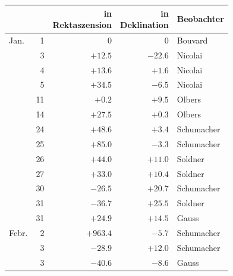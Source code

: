 \begin{center}
\begin{tabular}{lr|r|r|l}
 & & \shortstack{in\\Rektaszension} & \shortstack{in\\Deklination} & Beobachter \\
\hline
Jan. & 1 & 0 & 0 & Bouvard \\
 & 3 & $+12.5$ & $-22.6$ & Nicolai \\
 & 4 & $+13.6$ & $+1.6$ & Nicolai \\
 & 5 & $+34.5$ & $-6.5$ & Nicolai \\
 & 11 & $+0.2$ & $+9.5$ & Olbers \\
 & 14 & $+27.5$ & $+0.3$ & Olbers \\
 & 24 & $+48.6$ & $+3.4$ & Schumacher \\
 & 25 & $+85.0$ & $-3.3$ & Schumacher \\
 & 26 & $+44.0$ & $+11.0$ & Soldner \\
 & 27 & $+33.0$ & $+10.4$ & Soldner \\
 & 30 & $-26.5$ & $+20.7$ & Schumacher \\
 & 31 & $-36.7$ & $+25.5$ & Soldner \\
 & 31 & $+24.9$ & $+14.5$ & Gauss \\
Febr. & 2 & $+963.4$ & $-5.7$ & Schumacher \\
 & 3 & $-28.9$ & $+12.0$ & Schumacher \\
 & 3 & $-40.6$ & $-8.6$ & Gauss \\
\end{tabular}
\end{center}

